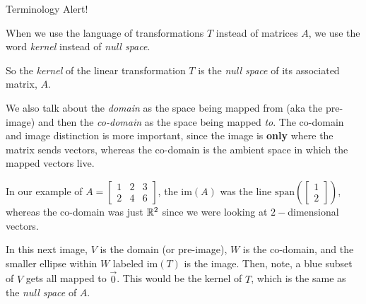 \documentclass{ximera}
\begin{document}
\begin{remark}{Terminology Alert!}

    When we use the language of transformations $T$ instead of matrices $A$, we use the word \emph{kernel} instead of \emph{null space}.

    So the \emph{kernel} of the linear transformation $T$ is the \emph{null space} of its associated matrix, $A$.

    We also talk about the \emph{domain} as the space being mapped from (aka the pre-image) and then the \emph{co-domain} as the space being mapped \emph{to}. The co-domain and image distinction is more important, since the image is {\bf only} where the matrix sends vectors, whereas the co-domain is the ambient space in which the mapped vectors live. 

    In our example of $A=\begin{bmatrix}1&2&3\\2&4&6\end{bmatrix}$, the $\mbox{im}(A)$ was the line $\text{span}\left(\begin{bmatrix}1\\2\end{bmatrix}\right)$, whereas the co-domain was just $\mathbb{R}^2$ since we were looking at $2-$dimensional vectors. 

    In this next image, $V$ is the domain (or pre-image), $W$ is the co-domain, and the smaller ellipse within $W$ labeled $\mbox{im}(T)$ is the image. Then, note, a blue subset of $V$ gets all mapped to $\vec{0}$. This would be the kernel of $T$, which is the same as the \emph{null space} of $A$.

    \begin{center}
    \end{center}

\end{remark}
\end{document}
